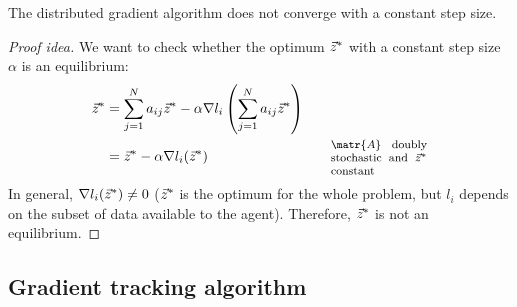 \begin{theorem}
    The distributed gradient algorithm does not converge with a constant step size.

    \begin{proof}[Proof idea]

        We want to check whether the optimum ${\vec{z}}^*$ with a constant step size $\alpha$ is an equilibrium:
        \[
            \begin{aligned}
                \z^* &= \sum_{j=1}^N a_{ij} \z^* - \alpha \nabla l_i \left( \sum_{j=1}^N a_{ij} \z^* \right) \\
                &= \z^* - \alpha \nabla l_i (\z^*) &&& \parbox{0.20\linewidth}{\footnotesize $\matr{A}$ doubly stochastic and $\z^*$ constant} \\
            \end{aligned}
        \]
        In general, $\nabla l_i({\vec{z}}^*) \neq 0$ (${\vec{z}}^*$ is the optimum for the whole problem, but $l_i$ depends on the subset of data available to the agent). Therefore, ${\vec{z}}^*$ is not an equilibrium.
    \end{proof}
\end{theorem}


\subsection{Gradient tracking algorithm} \label{sec:gradient_tracking_algorithm}

